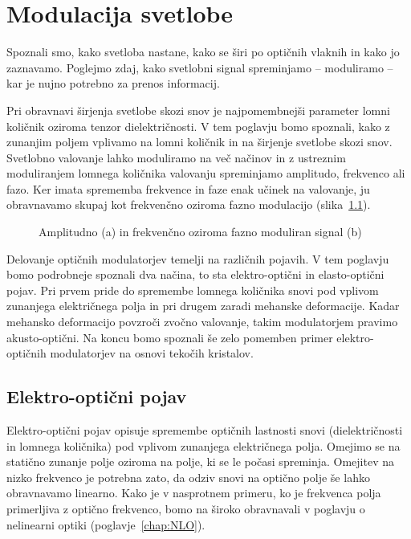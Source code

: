 
\chapter{Modulacija svetlobe}
\label{chap:modulacija}
Spoznali smo, kako svetloba nastane, kako se širi po optičnih vlaknih in kako
jo zaznavamo. Poglejmo zdaj, kako svetlobni signal spreminjamo -- moduliramo -- kar
je nujno potrebno za prenos informacij. 

Pri obravnavi širjenja svetlobe skozi snov je najpomembnejši parameter lomni količnik
oziroma tenzor dielektričnosti. V tem poglavju bomo spoznali, kako z zunanjim poljem vplivamo 
na lomni količnik in na širjenje svetlobe skozi snov. Svetlobno 
valovanje lahko moduliramo na več načinov in z ustreznim moduliranjem
lomnega količnika valovanju spreminjamo amplitudo, 
frekvenco ali fazo. Ker imata sprememba frekvence in faze enak učinek na valovanje, ju obravnavamo
skupaj kot frekvenčno oziroma fazno modulacijo
 (slika~\ref{fig:amfm}). 
\begin{figure}[h]
\centering
\def\svgwidth{140truemm} 

\caption{Amplitudno (a) in frekvenčno oziroma fazno moduliran signal (b)
}
\label{fig:amfm}
\end{figure}

Delovanje optičnih modulatorjev temelji na različnih pojavih. V tem poglavju bomo 
podrobneje spoznali dva načina, to sta elektro-optični in elasto-optični pojav. 
Pri prvem pride do spremembe lomnega količnika snovi pod vplivom zunanjega električnega polja in
pri drugem zaradi mehanske deformacije. Kadar mehansko deformacijo povzroči zvočno valovanje, 
takim modulatorjem pravimo akusto-optični. Na koncu bomo spoznali še zelo pomemben 
primer elektro-optičnih modulatorjev na osnovi tekočih kristalov.

\section{Elektro-optični pojav}
\label{chap:EO}
Elektro-optični pojav opisuje spremembe optičnih lastnosti 
snovi (dielektričnosti in lomnega količnika) pod vplivom 
zunanjega električnega polja. Omejimo se na statično zunanje polje oziroma
na polje, ki se le počasi spreminja. Omejitev na nizko 
frekvenco je potrebna zato, da odziv snovi na optično polje še lahko obravnavamo linearno. 
Kako je v nasprotnem primeru, ko je frekvenca polja primerljiva z optično frekvenco, 
bomo na široko obravnavali v poglavju o nelinearni optiki (poglavje~\ref{chap:NLO}).

